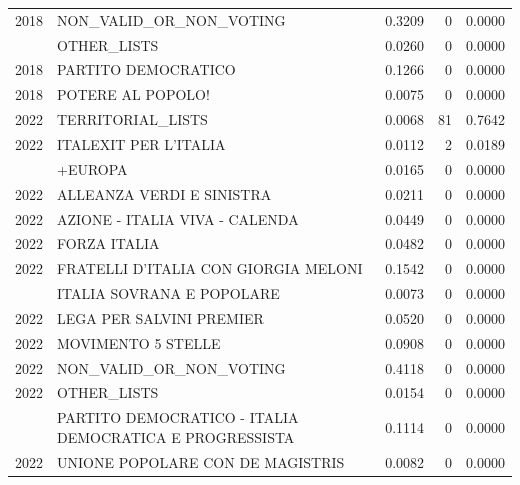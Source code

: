 \begin{longtable}[t]{rlrrr}
2018 & NON\_VALID\_OR\_NON\_VOTING & 0.3209 & 0 & 0.0000\\
\addlinespace
2018 & OTHER\_LISTS & 0.0260 & 0 & 0.0000\\
2018 & PARTITO DEMOCRATICO & 0.1266 & 0 & 0.0000\\
2018 & POTERE AL POPOLO! & 0.0075 & 0 & 0.0000\\
2022 & TERRITORIAL\_LISTS & 0.0068 & 81 & 0.7642\\
2022 & ITALEXIT PER L'ITALIA & 0.0112 & 2 & 0.0189\\
\addlinespace
2022 & +EUROPA & 0.0165 & 0 & 0.0000\\
2022 & ALLEANZA VERDI E SINISTRA & 0.0211 & 0 & 0.0000\\
2022 & AZIONE - ITALIA VIVA - CALENDA & 0.0449 & 0 & 0.0000\\
2022 & FORZA ITALIA & 0.0482 & 0 & 0.0000\\
2022 & FRATELLI D'ITALIA CON GIORGIA MELONI & 0.1542 & 0 & 0.0000\\
\addlinespace
2022 & ITALIA SOVRANA E POPOLARE & 0.0073 & 0 & 0.0000\\
2022 & LEGA PER SALVINI PREMIER & 0.0520 & 0 & 0.0000\\
2022 & MOVIMENTO 5 STELLE & 0.0908 & 0 & 0.0000\\
2022 & NON\_VALID\_OR\_NON\_VOTING & 0.4118 & 0 & 0.0000\\
2022 & OTHER\_LISTS & 0.0154 & 0 & 0.0000\\
\addlinespace
2022 & PARTITO DEMOCRATICO - ITALIA DEMOCRATICA E PROGRESSISTA & 0.1114 & 0 & 0.0000\\
2022 & UNIONE POPOLARE CON DE MAGISTRIS & 0.0082 & 0 & 0.0000\\
\bottomrule
\end{longtable}

